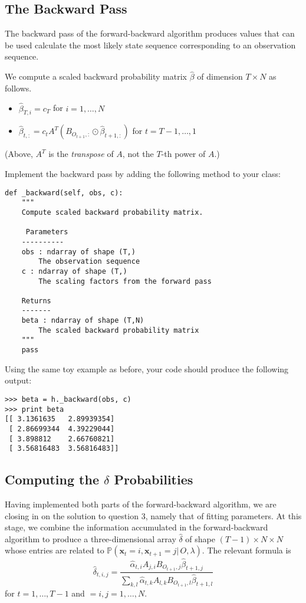 \subsection*{The Backward Pass}
The backward pass of the forward-backward algorithm produces values that can be used calculate the most likely state sequence corresponding to an observation sequence.

We compute a scaled backward probability matrix $\widehat{\beta}$ of dimension $T \times N$ as follows.
\begin{itemize}
 \item $\widehat{\beta}_{T,i} = c_{T}$ for $i = 1,\ldots, N$
 \item $\widehat{\beta}_{t,:} = c_{t}A^T(B_{O_{t+1},:}\odot \widehat{\beta}_{t+1,:})$ for $t = T-1, \ldots, 1$
\end{itemize}
(Above, $A^T$ is the \emph{transpose} of $A$, not the $T$-th power of $A$.)

\begin{problem}
Implement the backward pass by adding the following method to your class:
\begin{lstlisting}
def _backward(self, obs, c):
    """
    Compute scaled backward probability matrix.

     Parameters
    ----------
    obs : ndarray of shape (T,)
        The observation sequence
    c : ndarray of shape (T,)
        The scaling factors from the forward pass

    Returns
    -------
    beta : ndarray of shape (T,N)
        The scaled backward probability matrix
    """
    pass
\end{lstlisting}
Using the same toy example as before, your code should produce the following output:
\begin{lstlisting}
>>> beta = h._backward(obs, c)
>>> print beta
[[ 3.1361635   2.89939354]
 [ 2.86699344  4.39229044]
 [ 3.898812    2.66760821]
 [ 3.56816483  3.56816483]]
\end{lstlisting}
\end{problem}

\subsection*{Computing the $\delta$ Probabilities}
Having implemented both parts of the forward-backward algorithm, we are closing in on the solution to question 3, namely that of fitting parameters.
At this stage, we combine the information accumulated in the forward-backward algorithm to produce a three-dimensional array $\widehat{\delta}$
of shape $(T-1)\times N \times N$ whose entries are related to $\mathbb{P}(\mathbf{x}_t = i, \mathbf{x}_{t+1} = j|\, O, \lambda)$.
The relevant formula is
\[
\widehat{\delta}_{t,i,j} = \frac{\widehat{\alpha}_{t,i}A_{j,i}B_{O_{t+1},j}\widehat{\beta}_{t+1,j}}{\sum_{k,l}\widehat{\alpha}_{t,k}A_{l,k}B_{O_{t+1},l}\widehat{\beta}_{t+1,l}}
\]
for $t = 1, \ldots, T-1$ and $=i,j = 1, \ldots, N$.

